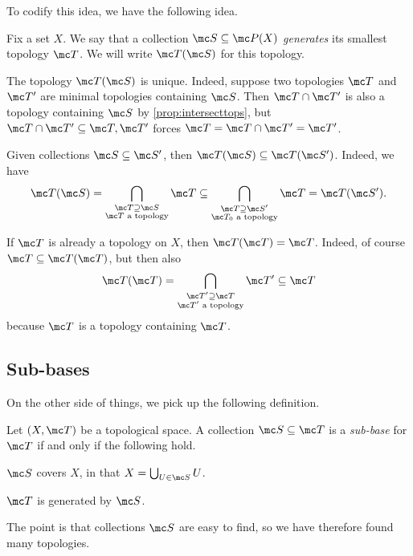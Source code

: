 \documentclass[../notes.tex]{subfiles}
\begin{document}
To codify this idea, we have the following idea.
\begin{defihelper} 
	Fix a set $X$. We say that a collection $\mc S\subseteq\mc P(X)$ \textit{generates} its smallest topology $\mc T$. We will write $\mc T(\mc S)$ for this topology.
\end{defihelper}
\begin{remark}[Nir]
	The topology $\mc T(\mc S)$ is unique. Indeed, suppose two topologies $\mc T$ and $\mc T'$ are minimal topologies containing $\mc S$. Then $\mc T\cap\mc T'$ is also a topology containing $\mc S$ by \autoref{prop:intersecttops}, but $\mc T\cap\mc T'\subseteq\mc T,\mc T'$ forces $\mc T=\mc T\cap\mc T'=\mc T'$.
\end{remark}
\begin{remark}[Nir] \label{rem:largersubbase}
	Given collections $\mc S\subseteq\mc S'$, then $\mc T(\mc S)\subseteq\mc T(\mc S')$. Indeed, we have
	\[\mc T(\mc S)=\bigcap_{\substack{\mc T\supseteq\mc S\\\mc T\text{ a topology}}}\mc T\subseteq\bigcap_{\substack{\mc T\supseteq\mc S'\\\mc T_0\text{ a topology}}}\mc T=\mc T(\mc S').\]
\end{remark}
\begin{remark}[Nir] \label{rem:topgenitself}
	If $\mc T$ is already a topology on $X$, then $\mc T(\mc T)=\mc T$. Indeed, of course $\mc T\subseteq\mc T(\mc T)$, but then also
	\[\mc T(\mc T)=\bigcap_{\substack{\mc T'\supseteq\mc T\\\mc T'\text{ a topology}}}\mc T'\subseteq\mc T\]
	because $\mc T$ is a topology containing $\mc T$.
\end{remark}

\subsection{Sub-bases}
On the other side of things, we pick up the following definition.
\begin{definition}
	Let $(X,\mc T)$ be a topological space. A collection $\mc S\subseteq\mc T$ is a \textit{sub-base} for $\mc T$ if and only if the following hold.
	\begin{listalph}
		\item $\mc S$ covers $X$, in that $X=\bigcup_{U\in\mc S}U$.
		\item $\mc T$ is generated by $\mc S$.
	\end{listalph}
\end{definition}
The point is that collections $\mc S$ are easy to find, so we have therefore found many topologies.
\end{document}
